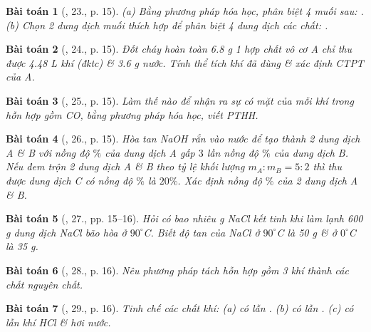 \documentclass{article}
\newtheorem{baitoan}{Bài toán}
\begin{document}
\begin{baitoan}[\cite{An_400_BT_Hoa_Hoc_9}, 23., p. 15]
	(a) Bằng phương pháp hóa học, phân biệt 4 muối sau: {\rm{}}. (b) Chọn 2 dung dịch muối thích hợp để phân biệt 4 dung dịch các chất: {\rm{}}.
\end{baitoan}

\begin{baitoan}[\cite{An_400_BT_Hoa_Hoc_9}, 24., p. 15]
	Đốt cháy hoàn toàn {\rm6.8 g} 1 hợp chất vô cơ A chỉ thu được {\rm4.48 L} khí {\rm{}} (đktc) \& {\rm3.6 g} nước. Tính thể tích khí {\rm{}} đã dùng \& xác định {\rm CTPT} của A.
\end{baitoan}

\begin{baitoan}[\cite{An_400_BT_Hoa_Hoc_9}, 25., p. 15]
	Làm thế nào để nhận ra sự có mặt của mỗi khí trong hỗn hợp gồm {\rm CO, } bằng phương pháp hóa học, viết {\rm PTHH}.
\end{baitoan}

\begin{baitoan}[\cite{An_400_BT_Hoa_Hoc_9}, 26., p. 15]
	Hòa tan {\rm NaOH} rắn vào nước để tạo thành 2 dung dịch A \& B với nồng độ $\%$ của dung dịch A gấp $3$ lần nồng độ $\%$ của dung dịch B. Nếu đem trộn 2 dung dịch A \& B theo tỷ lệ khối lượng $m_A:m_B = 5:2$ thì thu được dung dịch C có nồng độ $\%$ là $20\%$. Xác định nồng độ $\%$ của 2 dung dịch A \& B.
\end{baitoan}

\begin{baitoan}[\cite{An_400_BT_Hoa_Hoc_9}, 27., pp. 15--16]
	Hỏi có bao nhiêu {\rm g NaCl} kết tinh khi làm lạnh {\rm600 g} dung dịch {\rm NaCl} bão hòa ở $90^\circ${\rm C}. Biết độ tan của {\rm NaCl} ở $90^\circ${\rm C} là {\rm50 g} \& ở $0^\circ${\rm C} là {\rm35 g}.
\end{baitoan}

\begin{baitoan}[\cite{An_400_BT_Hoa_Hoc_9}, 28., p. 16]
	Nêu phương pháp tách hỗn hợp gồm 3 khí {\rm{}} thành các chất nguyên chất.
\end{baitoan}

\begin{baitoan}[\cite{An_400_BT_Hoa_Hoc_9}, 29., p. 16]
	Tinh chế các chất khí: (a) {\rm{}} có lẫn {\rm{}}. (b) {\rm{}} có lẫn {\rm{}}. (c) {\rm{}} có lẫn khí {\rm HCl} \& hơi nước.
\end{baitoan}
\end{document}
